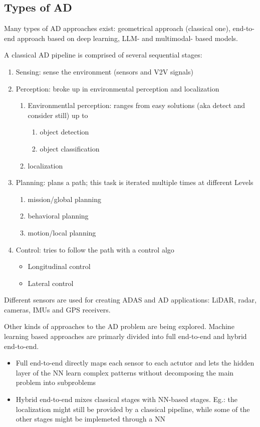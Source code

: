 \subsection{Types of AD}
Many types of AD approaches exist: geometrical approach (classical one), end-to-end approach based on deep learning, LLM- and multimodal- based models.

A classical AD pipeline is comprised of several sequential stages:
\begin{enumerate}
  \item Sensing: sense the environment (sensors and V2V signals)
  \item Perception: broke up in environmental perception and localization
    \begin{enumerate}
      \item Environmentlal perception: ranges from easy solutions (aka detect and consider still) up to 
        \begin{enumerate}
          \item object detection
          \item object classification
        \end{enumerate}
      \item localization
    \end{enumerate}
  \item Planning: plans a path; this task is iterated multiple times at different Levels
    \begin{enumerate}
      \item mission/global planning
      \item behavioral planning
      \item motion/local planning
    \end{enumerate}
  \item Control: tries to follow the path with a control algo
    \begin{itemize}
      \item Longitudinal control
      \item Lateral control
    \end{itemize}
\end{enumerate}

Different sensors are used for creating ADAS and AD applications: LiDAR, radar, cameras, IMUs and GPS receivers.

Other kinds of approaches to the AD problem are being explored. Machine learning based approaches are primarly divided into full end-to-end and hybrid end-to-end.
\begin{itemize}
  \item Full end-to-end directly maps each sensor to each actutor and lets the hidden layer of the NN learn complex patterns without decomposing the main problem into subproblems
  \item Hybrid end-to-end mixes classical stages with NN-based stages. Eg.: the localization might still be provided by a classical pipeline, while some of the other stages might be implemeted through a NN 
\end{itemize}

